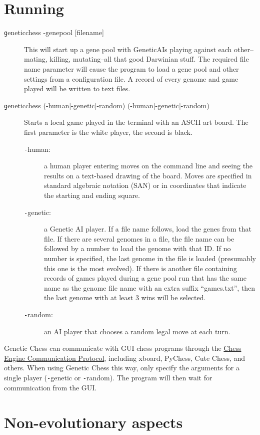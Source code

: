 \documentclass[letter]{article}
\newcommand{\code}[1]{{\texttt #1}}
\renewcommand\_{\textunderscore\allowbreak}
\begin{document}
\section{Running}
\begin{description}
	\item[\code{genetic\_chess -genepool [file\_name]}]
This will start up a gene pool with Genetic\_AIs playing against each other--mating, killing, mutating--all that good Darwinian stuff. The required file name parameter will cause the program to load a gene pool and other settings from a configuration file. A record of every genome and game played will be written to text files.

	\item[\code{genetic\_chess (-human|-genetic|-random) (-human|-genetic|-random)}]
Starts a local game played in the terminal with an ASCII art board. The first parameter is the white player, the second is black.
	\begin{description}
		\item[\code{-human}:] a human player entering moves on the command line and seeing the results on a text-based drawing of the board. Moves are specified in standard algebraic notation (SAN) or in coordinates that indicate the starting and ending square. 
		\item[\code{-genetic}:] a Genetic AI player. If a file name follows, load the genes from that file. If there are several genomes in a file, the file name can be followed by a number to load the genome with that ID. If no number is specified, the last genome in the file is loaded (presumably this one is the most evolved). If there is another file containing records of games played during a gene pool run that has the same name as the genome file name with an extra suffix ``\_games.txt'', then the last genome with at least 3 wins will be selected.
		\item[\code{-random}:] an AI player that chooses a random legal move at each turn.
	\end{description}
\end{description}
Genetic Chess can communicate with GUI chess programs through the \href{https://www.gnu.org/software/xboard/engine-intf.html}{Chess Engine Communication Protocol}, including xboard, PyChess, Cute Chess, and others. When using Genetic Chess this way, only specify the arguments for a single player (\code{-genetic} or \code{-random}). The program will then wait for communication from the GUI.


\section{Non-evolutionary aspects}
\end{document}
